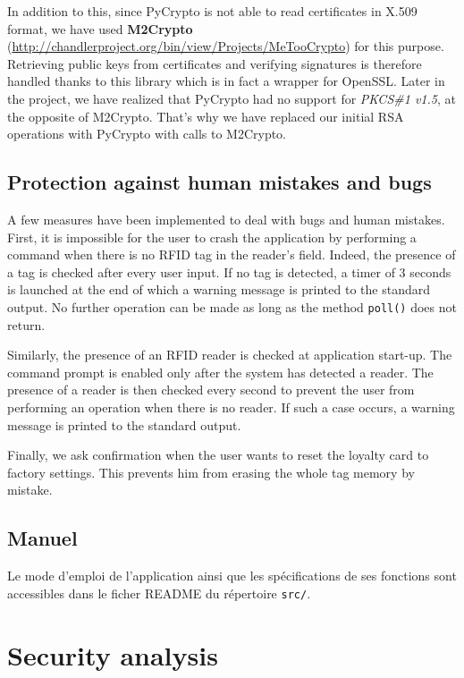 \documentclass[a4paper,11pt,oneside]{article}
\begin{document}
In addition to this, since PyCrypto is not able to read certificates in X.509
format, we have used \textbf{M2Crypto}
(\url{http://chandlerproject.org/bin/view/Projects/MeTooCrypto}) for this
purpose. Retrieving public keys from certificates and verifying signatures is
therefore handled thanks to this library which is in fact a wrapper for OpenSSL. 
Later in the project, we have realized that PyCrypto had no support for
\textit{PKCS\#1
v1.5}, at the opposite of M2Crypto. That's why we have replaced our initial RSA
operations with PyCrypto with calls to M2Crypto.

\subsection{Protection against human mistakes and bugs}

A few measures have been implemented to deal with bugs and human mistakes.
First, it is impossible for the user to crash the application by performing a
command when there is no RFID tag in the reader's field. Indeed, the presence of
a tag is checked after every user input. If no tag is detected, a timer of 3
seconds is launched at the end of which a warning message is printed to the
standard output. No further operation can be made as long as the method
\texttt{poll()}
does not return. 

Similarly, the presence of an RFID reader is checked at application start-up.
The command prompt is enabled only after the system has detected a reader. The
presence of a reader is then checked every second to prevent the user from
performing an operation when there is no reader. If such a case occurs, a
warning message is printed to the standard output. 

Finally, we ask confirmation when the user wants to reset the loyalty card to factory settings. This prevents him from erasing the whole tag memory by mistake.  


\subsection{Manuel}

Le mode d'emploi de l'application ainsi que les spécifications de ses fonctions
sont accessibles dans le ficher README du répertoire \texttt{src/}.


\newpage
\section{Security analysis}
\end{document}
